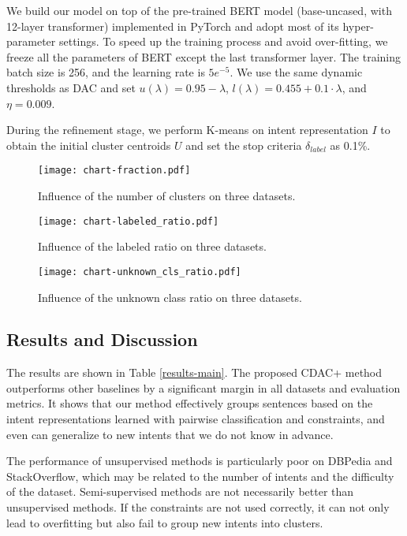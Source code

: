 \documentclass[letterpaper]{article} \usepackage{aaai20}  \usepackage{times}  \usepackage{helvet} \usepackage{courier}  \usepackage[hyphens]{url}  \usepackage{graphicx} \urlstyle{rm} \def\UrlFont{\rm}  \usepackage{graphicx}  \frenchspacing  \setlength{\pdfpagewidth}{8.5in}  \setlength{\pdfpageheight}{11in}
\begin{document}
We build our model on top of the pre-trained BERT model (base-uncased, with 12-layer transformer) implemented in PyTorch \cite{Wolf2019HuggingFacesTS} and adopt most of its hyper-parameter settings. To speed up the training process and avoid over-fitting, we freeze all the parameters of BERT except the last transformer layer. The training batch size is 256, and the learning rate is $5e^{-5}$. We use the same dynamic thresholds as DAC \cite{chang2017deep} and set $u(\lambda) = 0.95 - \lambda$, $l(\lambda) = 0.455 + 0.1 \cdot \lambda$, and $\eta = 0.009$.

During the refinement stage, we perform K-means on intent representation $I$ to obtain the initial cluster centroids $U$ and set the stop criteria $\delta_{label}$ as 0.1\%.

\begin{figure*}[!t]
  \centering  
  \texttt{[image: chart-fraction.pdf]}
  \caption{\label{fraction} Influence of the number of clusters on three datasets.}
\end{figure*}

\begin{figure*}[!t]
  \centering  
  \texttt{[image: chart-labeled\_ratio.pdf]}
  \caption{\label{labeled} Influence of the labeled ratio on three datasets.}
\end{figure*}

\begin{figure*}[!t]
  \centering  
  \texttt{[image: chart-unknown\_cls\_ratio.pdf]}
  \caption{\label{unknown} Influence of the unknown class ratio on three datasets.}
\end{figure*}

\subsection{Results and Discussion}
The results are shown in Table \ref{results-main}. The proposed CDAC+ method outperforms other baselines by a significant margin in all datasets and evaluation metrics. It shows that our method effectively groups sentences based on the intent representations learned with pairwise classification and constraints, and even can generalize to new intents that we do not know in advance. 

The performance of unsupervised methods is particularly poor on DBPedia and StackOverflow, which may be related to the number of intents and the difficulty of the dataset. Semi-supervised methods are not necessarily better than unsupervised methods. If the constraints are not used correctly, it can not only lead to overfitting but also fail to group new intents into clusters. 
\end{document}
